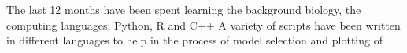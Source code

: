 The last 12 months have been spent learning the background biology, the computing languages; Python, R and C++
A variety of scripts have been written in different languages to help in the process of model selection and plotting of 